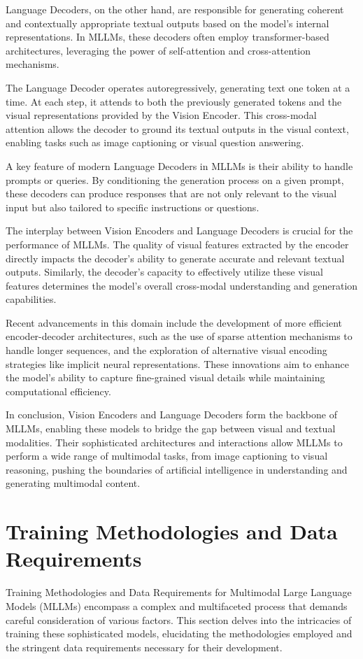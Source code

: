 Language Decoders, on the other hand, are responsible for generating coherent and contextually appropriate textual outputs based on the model's internal representations. In MLLMs, these decoders often employ transformer-based architectures, leveraging the power of self-attention and cross-attention mechanisms.

The Language Decoder operates autoregressively, generating text one token at a time. At each step, it attends to both the previously generated tokens and the visual representations provided by the Vision Encoder. This cross-modal attention allows the decoder to ground its textual outputs in the visual context, enabling tasks such as image captioning or visual question answering.

A key feature of modern Language Decoders in MLLMs is their ability to handle prompts or queries. By conditioning the generation process on a given prompt, these decoders can produce responses that are not only relevant to the visual input but also tailored to specific instructions or questions.

The interplay between Vision Encoders and Language Decoders is crucial for the performance of MLLMs. The quality of visual features extracted by the encoder directly impacts the decoder's ability to generate accurate and relevant textual outputs. Similarly, the decoder's capacity to effectively utilize these visual features determines the model's overall cross-modal understanding and generation capabilities.

Recent advancements in this domain include the development of more efficient encoder-decoder architectures, such as the use of sparse attention mechanisms to handle longer sequences, and the exploration of alternative visual encoding strategies like implicit neural representations. These innovations aim to enhance the model's ability to capture fine-grained visual details while maintaining computational efficiency.

In conclusion, Vision Encoders and Language Decoders form the backbone of MLLMs, enabling these models to bridge the gap between visual and textual modalities. Their sophisticated architectures and interactions allow MLLMs to perform a wide range of multimodal tasks, from image captioning to visual reasoning, pushing the boundaries of artificial intelligence in understanding and generating multimodal content.

\section{Training Methodologies and Data Requirements}
Training Methodologies and Data Requirements for Multimodal Large Language Models (MLLMs) encompass a complex and multifaceted process that demands careful consideration of various factors. This section delves into the intricacies of training these sophisticated models, elucidating the methodologies employed and the stringent data requirements necessary for their development.


